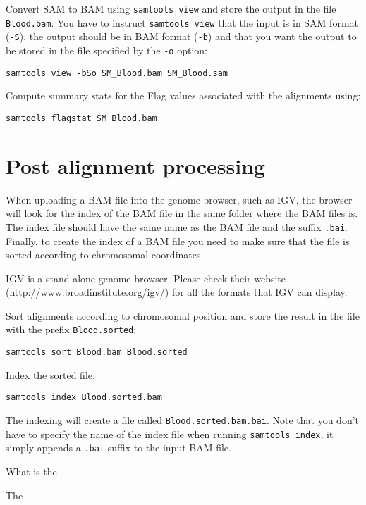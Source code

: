 \begin{steps}
Convert SAM to BAM using \texttt{samtools view} and store the output in the file
\texttt{Blood.bam}. You have to instruct \texttt{samtools view} that the input is in SAM
format (\texttt{-S}), the output should be in BAM format (\texttt{-b}) and that
you want the output to be stored in the file specified by the \texttt{-o}
option:

\begin{lstlisting}
samtools view -bSo SM_Blood.bam SM_Blood.sam
\end{lstlisting}
\end{steps}

\begin{advanced}
Compute summary stats for the Flag values associated with the alignments using:

\begin{lstlisting}
samtools flagstat SM_Blood.bam
\end{lstlisting}
\end{advanced}

\section{Post alignment processing}

\begin{information}
When uploading a BAM file into the genome browser, such as IGV, the browser will look for the
index of the BAM file in the same folder where the BAM files is. The index file
should have the same name as the BAM file and the suffix \texttt{.bai}. Finally, to
create the index of a BAM file you need to make sure that the file is sorted
according to chromosomal coordinates.
\begin{note}
IGV is a stand-alone genome browser. Please check their website
(\url{http://www.broadinstitute.org/igv/}) for all the formats that IGV
can display. 
\end{note}

\end{information}


\begin{steps}
Sort alignments according to chromosomal position and store the result in the
file with the prefix \texttt{Blood.sorted}:

\begin{lstlisting}
samtools sort Blood.bam Blood.sorted
\end{lstlisting}

Index the sorted file.

\begin{lstlisting}
samtools index Blood.sorted.bam
\end{lstlisting}

The indexing will create a file called \texttt{Blood.sorted.bam.bai}. Note that
you don't have to specify the name of the index file when running
\texttt{samtools index}, it simply appends a \texttt{.bai} suffix to the input
BAM file.
\end{steps}


\begin{questions}
What is the 
\begin{answer}
The 
\end{answer}
\end{questions}




